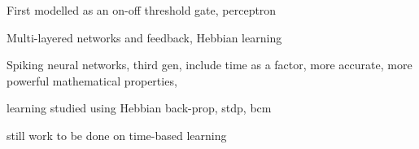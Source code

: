 First modelled as an on-off threshold gate, perceptron

Multi-layered networks and feedback, Hebbian learning

Spiking neural networks, third gen, include time as a factor, more accurate, more powerful mathematical properties, 

learning studied using Hebbian back-prop, stdp, bcm

still work to be done on time-based learning